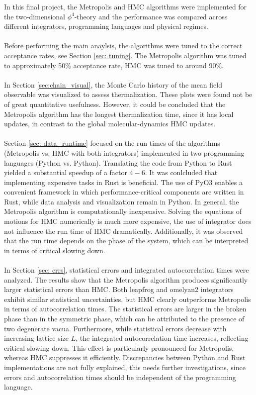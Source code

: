 In this final project, the Metropolis and HMC algorithms were implemented for the two-dimensional $\phi^4$-theory and the performance was compared across different integrators, programming languages and physical regimes. 
\\\\
Before performing the main anaylsis, the algorithms were tuned to the correct acceptance rates, see Section \ref{sec: tuning}. The Metropolis algorithm was tuned to approximately 50\% acceptance rate, HMC was tuned to around 90\%. 
\\\\
In Section \ref{sec:chain_visual}, the Monte Carlo history of the mean field observable was visualized to assess thermalization. These plots were found not be of great quantitative usefulness. However, it could be concluded that the Metropolis algorithm has the longest thermalization time, since it has local updates, in contrast to the global molecular-dynamics HMC updates. 
\\\\
Section \ref{sec: data_runtime} focused on the run times of the algorithms (Metropolis vs. HMC with both integrators) implemented in two programming languages (Python vs. Python). Translating the code from Python to Rust yielded a substantial speedup of a factor $4-6$. It was conlcluded that implementing expensive tasks in Rust is beneficial. The use of PyO3 enables a convenient framework in which performance-critical components are written in Rust, while data analysis and visualization remain in Python. In general, the Metropolis algorithm is computationally inexpensive. Solving the equations of motions for HMC numerically is much more expensive, the use of integrator does not influence the run time of HMC dramatically. Additionally, it was observed that the run time depends on the phase of the system, which can be interpreted in terms of critical slowing down. 
\\\\
In Section \ref{sec: errs}, statistical errors and integrated autocorrelation times were analyzed. The results show that the Metropolis algorithm produces significantly larger statistical errors than HMC. Both leapfrog and omelyan2 integrators exhibit similar statistical uncertainties, but HMC clearly outperforms Metropolis in terms of autocorrelation times. The statistical errors are larger in the broken phase than in the symmetric phase, which can be attributed to the presence of two degenerate vacua. Furthermore, while statistical errors decrease with increasing lattice size $L$, the integrated autocorrelation time increases, reflecting critical slowing down. This effect is particularly pronounced for Metropolis, whereas HMC suppresses it efficiently. Discrepancies between Python and Rust implementations are not fully explained, this needs further investigations, since errors and autocorrelation times should be independent of the programming language. 

